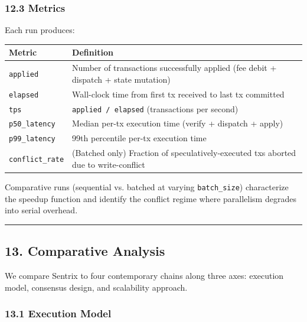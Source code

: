 \documentclass[11pt,a4paper]{article}
\begin{document}
\hypertarget{123-metrics}{%
\subsubsection{12.3 Metrics}\label{123-metrics}}

Each run produces:

\begin{longtable}[]{@{}ll@{}}
\toprule\noalign{}
Metric & Definition \\
\midrule\noalign{}
\endhead
\bottomrule\noalign{}
\endlastfoot
\texttt{applied} & Number of transactions successfully applied (fee
debit + dispatch + state mutation) \\
\texttt{elapsed} & Wall-clock time from first tx received to last tx
committed \\
\texttt{tps} & \texttt{applied\ /\ elapsed} (transactions per second) \\
\texttt{p50\_latency} & Median per-tx execution time (verify + dispatch
+ apply) \\
\texttt{p99\_latency} & 99th percentile per-tx execution time \\
\texttt{conflict\_rate} & (Batched only) Fraction of
speculatively-executed txs aborted due to write-conflict \\
\end{longtable}

Comparative runs (sequential vs. batched at varying
\texttt{batch\_size}) characterize the speedup function and identify the
conflict regime where parallelism degrades into serial overhead.

\begin{center}\rule{0.5\linewidth}{0.5pt}\end{center}

\hypertarget{13-comparative-analysis}{%
\subsection{13. Comparative Analysis}\label{13-comparative-analysis}}

We compare Sentrix to four contemporary chains along three axes:
execution model, consensus design, and scalability approach.

\hypertarget{131-execution-model}{%
\subsubsection{13.1 Execution Model}\label{131-execution-model}}
\end{document}
